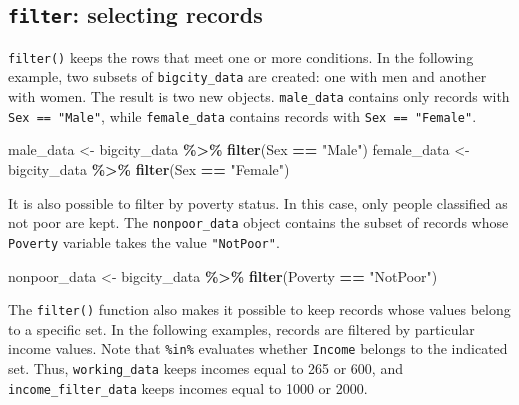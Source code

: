\documentclass[
  english,
  12pt,
]{book}
\newenvironment{Shaded}{\begin{snugshade}}{\end{snugshade}}
\newcommand{\FunctionTok}[1]{\textcolor[rgb]{0.13,0.29,0.53}{\textbf{#1}}}
\newcommand{\NormalTok}[1]{#1}
\newcommand{\OtherTok}[1]{\textcolor[rgb]{0.56,0.35,0.01}{#1}}
\newcommand{\SpecialCharTok}[1]{\textcolor[rgb]{0.81,0.36,0.00}{\textbf{#1}}}
\newcommand{\StringTok}[1]{\textcolor[rgb]{0.31,0.60,0.02}{#1}}
\begin{document}
\subsection{\texorpdfstring{\texttt{filter}: selecting records}{filter: selecting records}}\label{filter-seleccion-de-registros}

\texttt{filter()} keeps the rows that meet one or more conditions. In the following example, two subsets of \texttt{bigcity\_data} are created: one with men and another with women. The result is two new objects. \texttt{male\_data} contains only records with \texttt{Sex\ ==\ "Male"}, while \texttt{female\_data} contains records with \texttt{Sex\ ==\ "Female"}.

\begin{Shaded}
\begin{Highlighting}[]
\NormalTok{male\_data }\OtherTok{\textless{}{-}}\NormalTok{ bigcity\_data }\SpecialCharTok{\%\textgreater{}\%}
  \FunctionTok{filter}\NormalTok{(Sex }\SpecialCharTok{==} \StringTok{"Male"}\NormalTok{)}
\NormalTok{female\_data }\OtherTok{\textless{}{-}}\NormalTok{ bigcity\_data }\SpecialCharTok{\%\textgreater{}\%}
  \FunctionTok{filter}\NormalTok{(Sex }\SpecialCharTok{==} \StringTok{"Female"}\NormalTok{)}
\end{Highlighting}
\end{Shaded}

It is also possible to filter by poverty status. In this case, only people classified as not poor are kept. The \texttt{nonpoor\_data} object contains the subset of records whose \texttt{Poverty} variable takes the value \texttt{"NotPoor"}.

\begin{Shaded}
\begin{Highlighting}[]
\NormalTok{nonpoor\_data }\OtherTok{\textless{}{-}}\NormalTok{ bigcity\_data }\SpecialCharTok{\%\textgreater{}\%}
  \FunctionTok{filter}\NormalTok{(Poverty }\SpecialCharTok{==} \StringTok{"NotPoor"}\NormalTok{)}
\end{Highlighting}
\end{Shaded}

The \texttt{filter()} function also makes it possible to keep records whose values belong to a specific set. In the following examples, records are filtered by particular income values. Note that \texttt{\%in\%} evaluates whether \texttt{Income} belongs to the indicated set. Thus, \texttt{working\_data} keeps incomes equal to 265 or 600, and \texttt{income\_filter\_data} keeps incomes equal to 1000 or 2000.
\end{document}
